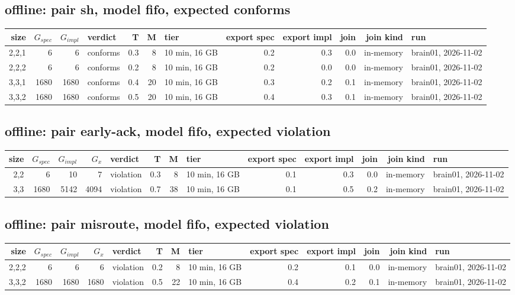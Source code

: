 \documentclass[10pt]{article}
\begin{document}
\subsection*{offline: pair \textsf{sh}, model fifo, expected conforms}
\begin{longtable}{@{}rrrlrrlrrrrl@{}}
\toprule
size & $G_{\mathit{spec}}$ & $G_{\mathit{impl}}$ & verdict & T & M & tier & export spec & export impl & join & join kind & run \\
\midrule
\endhead
\color{red} 2,2,1 & 6 & 6 & conforms & 0.3 & 8 & 10 min, 16 GB & 0.2 & 0.3 & 0.0 & in-memory & brain01, 2026-11-02 \\
\color{red} 2,2,2 & 6 & 6 & conforms & 0.2 & 8 & 10 min, 16 GB & 0.2 & 0.0 & 0.0 & in-memory & brain01, 2026-11-02 \\
\color{red} 3,3,1 & 1680 & 1680 & conforms & 0.4 & 20 & 10 min, 16 GB & 0.3 & 0.2 & 0.1 & in-memory & brain01, 2026-11-02 \\
\color{red} 3,3,2 & 1680 & 1680 & conforms & 0.5 & 20 & 10 min, 16 GB & 0.4 & 0.3 & 0.1 & in-memory & brain01, 2026-11-02 \\
\bottomrule
\end{longtable}
\subsection*{offline: pair \textsf{early-ack}, model fifo, expected violation}
\begin{longtable}{@{}rrrrlrrlrrrrl@{}}
\toprule
size & $G_{\mathit{spec}}$ & $G_{\mathit{impl}}$ & $G_x$ & verdict & T & M & tier & export spec & export impl & join & join kind & run \\
\midrule
\endhead
\color{red} 2,2 & 6 & 10 & 7 & violation & 0.3 & 8 & 10 min, 16 GB & 0.1 & 0.3 & 0.0 & in-memory & brain01, 2026-11-02 \\
\color{red} 3,3 & 1680 & 5142 & 4094 & violation & 0.7 & 38 & 10 min, 16 GB & 0.1 & 0.5 & 0.2 & in-memory & brain01, 2026-11-02 \\
\bottomrule
\end{longtable}
\subsection*{offline: pair \textsf{misroute}, model fifo, expected violation}
\begin{longtable}{@{}rrrrlrrlrrrrl@{}}
\toprule
size & $G_{\mathit{spec}}$ & $G_{\mathit{impl}}$ & $G_x$ & verdict & T & M & tier & export spec & export impl & join & join kind & run \\
\midrule
\endhead
\color{red} 2,2,2 & 6 & 6 & 6 & violation & 0.2 & 8 & 10 min, 16 GB & 0.2 & 0.1 & 0.0 & in-memory & brain01, 2026-11-02 \\
\color{red} 3,3,2 & 1680 & 1680 & 1680 & violation & 0.5 & 22 & 10 min, 16 GB & 0.4 & 0.2 & 0.1 & in-memory & brain01, 2026-11-02 \\
\bottomrule
\end{longtable}
\end{document}
